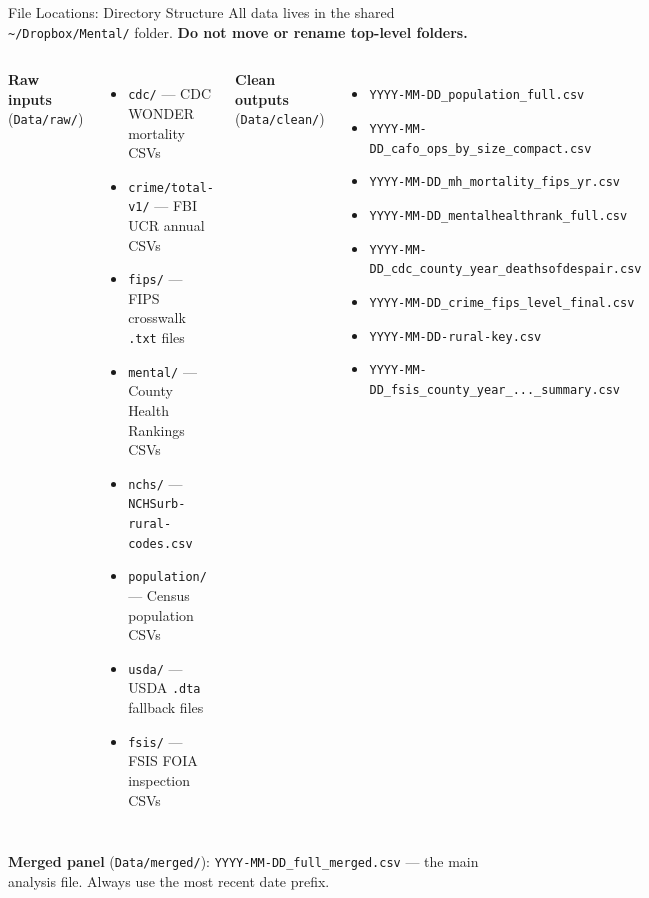\documentclass[aspectratio=169]{beamer}
\begin{document}
\begin{frame}{File Locations: Directory Structure}
All data lives in the shared \texttt{\textasciitilde/Dropbox/Mental/} folder. \textbf{Do not move or rename top-level folders.}

\vspace{0.5em}
\begin{columns}[T]
\textbf{Raw inputs} (\texttt{Data/raw/})
\begin{itemize}\small
    \item \texttt{cdc/} — CDC WONDER mortality CSVs
    \item \texttt{crime/total-v1/} — FBI UCR annual CSVs
    \item \texttt{fips/} — FIPS crosswalk \texttt{.txt} files
    \item \texttt{mental/} — County Health Rankings CSVs
    \item \texttt{nchs/} — \texttt{NCHSurb-rural-codes.csv}
    \item \texttt{population/} — Census population CSVs
    \item \texttt{usda/} — USDA \texttt{.dta} fallback files
    \item \texttt{fsis/} — FSIS FOIA inspection CSVs
\end{itemize}

\textbf{Clean outputs} (\texttt{Data/clean/})
\begin{itemize}\small
    \item \texttt{YYYY-MM-DD\_population\_full.csv}
    \item \texttt{YYYY-MM-DD\_cafo\_ops\_by\_size\_compact.csv}
    \item \texttt{YYYY-MM-DD\_mh\_mortality\_fips\_yr.csv}
    \item \texttt{YYYY-MM-DD\_mentalhealthrank\_full.csv}
    \item \texttt{YYYY-MM-DD\_cdc\_county\_year\_deathsofdespair.csv}
    \item \texttt{YYYY-MM-DD\_crime\_fips\_level\_final.csv}
    \item \texttt{YYYY-MM-DD-rural-key.csv}
    \item \texttt{YYYY-MM-DD\_fsis\_county\_year\_...\_summary.csv}
\end{itemize}
\end{columns}

\vspace{0.5em}
{\small \textbf{Merged panel} (\texttt{Data/merged/}): \texttt{YYYY-MM-DD\_full\_merged.csv} — the main analysis file. Always use the most recent date prefix.}
\end{frame}
\end{document}
